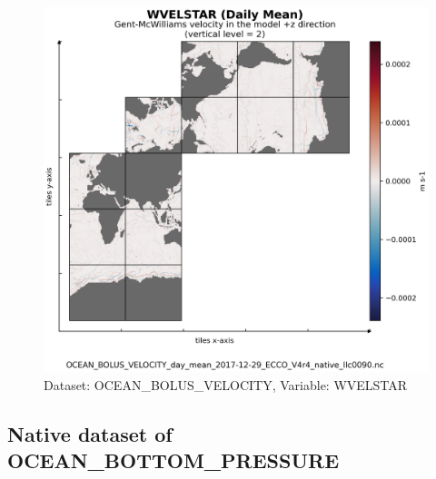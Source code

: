 \begin{figure}[H]
\centering
\includegraphics[scale=0.55]{../images/plots/v4r4/native_plots/Gent-McWilliams_Ocean_Bolus_Velocity/WVELSTAR.png}
\caption{Dataset: OCEAN\_BOLUS\_VELOCITY, Variable: WVELSTAR}
\label{tab:table-OCEAN_BOLUS_VELOCITY_WVELSTAR-Plot}
\end{figure}
\newpage
\subsection{Native dataset of OCEAN\_BOTTOM\_PRESSURE}
\newp
